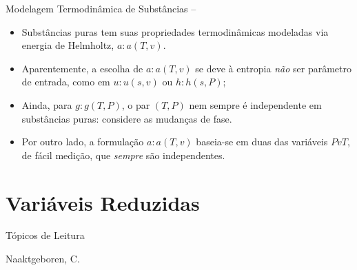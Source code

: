     \begin{frame}[allowframebreaks]{Modelagem Termodinâmica de Substâncias --}

        \begin{itemize}
            \item Substâncias puras tem suas propriedades termodinâmicas \alert{modeladas} via
                energia de \alert{Helmholtz}, \alert{$a\!:\!a(T, v)$}.
                \vspace*\medskipamount
            \item Aparentemente, a escolha de \alert{$a\!:\!a(T, v)$} se deve à entropia
                \emph{não} ser parâmetro de entrada, como em \alert{$u\!:\!u(s, v)$} ou
                \alert{$h\!:\!h(s, P)$};
                \vspace*\medskipamount
            \item Ainda, para \alert{$g\!:\!g(T, P)$}, o par \alert{$(T, P)$} nem sempre é
                \alert{independente} em \alert{substâncias puras}: considere as mudanças de
                fase.
                \vspace*\medskipamount
            \item Por outro lado, a formulação \alert{$a\!:\!a(T, v)$} baseia-se em duas das
                variáveis \alert{$PvT$}, de \alert{fácil medição}, que \alert{\emph{sempre}} são
                independentes.
        \end{itemize}

    \end{frame}

\section{Variáveis Reduzidas}

    \begin{frame}{Tópicos de Leitura}
        \begin{thebibliography}{Çengel, Y.~A., 2013}
                Naaktgeboren, C.
        \end{thebibliography}
    \end{frame}

